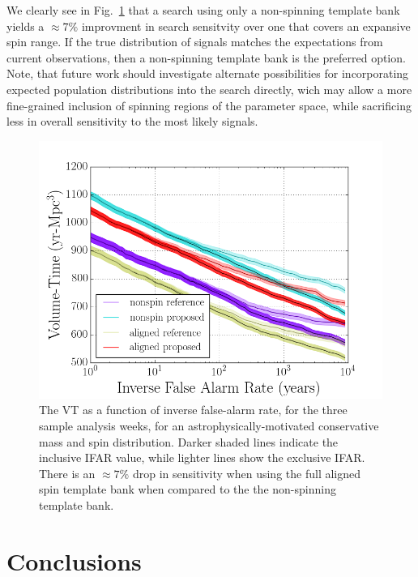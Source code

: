 We clearly see in Fig.~\ref{fig:rest} that a search using only a non-spinning template bank yields a $\approx{7\%}$ improvment in search sensitvity over one that covers an expansive spin range. If the true distribution of signals matches the expectations from current observations, then a non-spinning template bank is the preferred option. Note, that future work should investigate alternate possibilities for incorporating expected population distributions into the search directly, wich may allow a more fine-grained inclusion of spinning regions of the parameter space, while sacrificing less in overall sensitivity to the most likely signals.

\begin{figure}
\centering
\includegraphics[width=1.0\textwidth]{papers/bns_o1_dev/figures/rest_combined.png}
\caption{\label{fig:rest} 
The VT as a function of inverse false-alarm rate, for the
three sample analysis weeks, for an astrophysically-motivated conservative mass and spin distribution. Darker shaded lines indicate the inclusive IFAR value, while lighter lines show the exclusive IFAR. There is an $\approx 7\%$ drop in sensitivity when using the full aligned spin template bank when compared to the the non-spinning
template bank.}
\end{figure}

\section{Conclusions}

